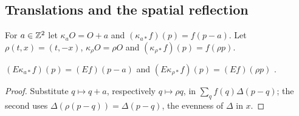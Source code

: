 \subsection{Translations and the spatial reflection}

\noindent For $a\in\mathbb Z^2$ let $\kappa_a O=O+a$ and $(\kappa_{a*}f)(p)=f(p-a)$. Let
$\rho(t,x)=(t,-x)$, $\kappa_\rho O=\rho O$ and $(\kappa_{\rho*}f)(p)=f(\rho p)$.

\begin{lemma}\label{lem:lattice-cov-E}
 $(E\kappa_{a*}f)(p)=(Ef)(p-a)$ and $(E\kappa_{\rho*}f)(p)=(Ef)(\rho p)$ .
\end{lemma}
\begin{proof}
Substitute $q\mapsto q+a$, respectively $q\mapsto\rho q$, in $\sum_qf(q)\Delta(p-q)$; the second
uses $\Delta(\rho(p-q))=\Delta(p-q)$, the evenness of $\Delta$ in $x$.
\end{proof}

